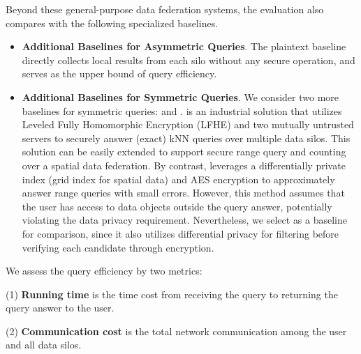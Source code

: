 Beyond these general-purpose data federation systems,
the evaluation also compares \sysname with the following specialized baselines.
\begin{itemize}
    \item \textbf{Additional Baselines for Asymmetric Queries}.
    The plaintext baseline \public directly collects local results from each silo without any secure operation, and serves as the upper bound of query efficiency.

    \item \textbf{Additional Baselines for Symmetric Queries}.
    We consider two more baselines for symmetric queries: \EDBT \cite{DBLP:conf/edbt/KesarwaniKNPSMM18} and \ICDE \cite{DBLP:conf/icde/SahinAAAP18}.
    \EDBT \cite{DBLP:conf/edbt/KesarwaniKNPSMM18} is an industrial solution that utilizes Leveled Fully Homomorphic Encryption (LFHE) and two mutually untrusted servers to securely answer (exact) kNN queries over multiple data silos.
    This solution can be easily extended to support secure range query and counting over a spatial data federation.
    By contrast, \ICDE \cite{DBLP:conf/icde/SahinAAAP18} leverages a differentially private index (\eg grid index for spatial data) and AES encryption \cite{goldreich2009foundations} to approximately answer range queries with small errors.
    However, this method assumes that the user has access to data objects outside the query answer, potentially violating the data privacy requirement.
    Nevertheless, we select \ICDE \cite{DBLP:conf/icde/SahinAAAP18} as a baseline for comparison, since it also utilizes differential privacy for filtering before verifying each candidate through encryption. 
\end{itemize}

We assess the query efficiency by two metrics:

(1) \textbf{Running time} is the time cost from receiving the query to returning the query answer to the user.

(2) \textbf{Communication cost} is the total network communication among the user and all data silos.


